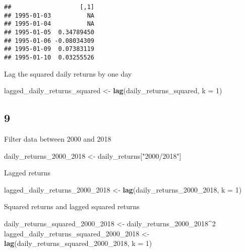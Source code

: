 \documentclass[
]{article}
\newenvironment{Shaded}{\begin{snugshade}}{\end{snugshade}}
\newcommand{\AttributeTok}[1]{\textcolor[rgb]{0.13,0.29,0.53}{#1}}
\newcommand{\DecValTok}[1]{\textcolor[rgb]{0.00,0.00,0.81}{#1}}
\newcommand{\FunctionTok}[1]{\textcolor[rgb]{0.13,0.29,0.53}{\textbf{#1}}}
\newcommand{\NormalTok}[1]{#1}
\newcommand{\OtherTok}[1]{\textcolor[rgb]{0.56,0.35,0.01}{#1}}
\newcommand{\SpecialCharTok}[1]{\textcolor[rgb]{0.81,0.36,0.00}{\textbf{#1}}}
\newcommand{\StringTok}[1]{\textcolor[rgb]{0.31,0.60,0.02}{#1}}
\begin{document}
\begin{verbatim}
##                   [,1]
## 1995-01-03          NA
## 1995-01-04          NA
## 1995-01-05  0.34789450
## 1995-01-06 -0.08034309
## 1995-01-09  0.07383119
## 1995-01-10  0.03255526
\end{verbatim}

Lag the squared daily returns by one day

\begin{Shaded}
\begin{Highlighting}[]
\NormalTok{lagged\_daily\_returns\_squared }\OtherTok{\textless{}{-}} \FunctionTok{lag}\NormalTok{(daily\_returns\_squared, }\AttributeTok{k =} \DecValTok{1}\NormalTok{)}
\end{Highlighting}
\end{Shaded}

\subsection{9}\label{section-8}

Filter data between 2000 and 2018

\begin{Shaded}
\begin{Highlighting}[]
\NormalTok{daily\_returns\_2000\_2018 }\OtherTok{\textless{}{-}}\NormalTok{ daily\_returns[}\StringTok{"2000/2018"}\NormalTok{]}
\end{Highlighting}
\end{Shaded}

Lagged returns

\begin{Shaded}
\begin{Highlighting}[]
\NormalTok{lagged\_daily\_returns\_2000\_2018 }\OtherTok{\textless{}{-}} \FunctionTok{lag}\NormalTok{(daily\_returns\_2000\_2018, }\AttributeTok{k =} \DecValTok{1}\NormalTok{)}
\end{Highlighting}
\end{Shaded}

Squared returns and lagged squared returns

\begin{Shaded}
\begin{Highlighting}[]
\NormalTok{daily\_returns\_squared\_2000\_2018 }\OtherTok{\textless{}{-}}\NormalTok{ daily\_returns\_2000\_2018}\SpecialCharTok{\^{}}\DecValTok{2}
\NormalTok{lagged\_daily\_returns\_squared\_2000\_2018 }\OtherTok{\textless{}{-}} \FunctionTok{lag}\NormalTok{(daily\_returns\_squared\_2000\_2018, }\AttributeTok{k =} \DecValTok{1}\NormalTok{)}
\end{Highlighting}
\end{Shaded}
\end{document}

